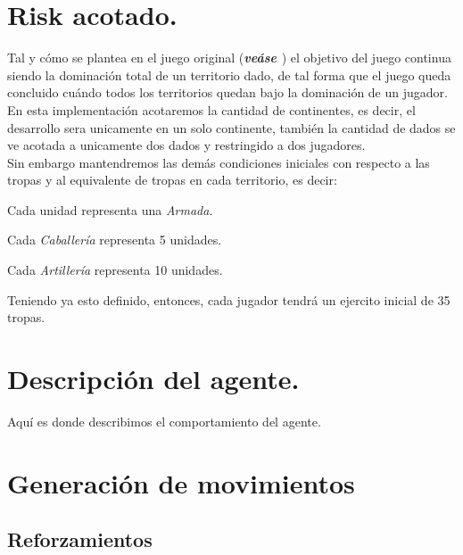 \documentclass[12pt,twocolumn,draft]{article}
\begin{document}
\section{Risk acotado.}

Tal y c\'omo se plantea en el juego original (\textbf{\textit{ve\'ase \cite{RISK}}}) el objetivo del juego continua siendo la dominaci\'on total de un territorio dado, de tal forma
que el juego queda concluido cu\'ando todos los territorios quedan bajo la dominaci\'on de 
un jugador.\\
En esta implementaci\'on acotaremos la cantidad de continentes, es decir, el desarrollo sera unicamente en un solo continente, tambi\'en la cantidad de dados se ve acotada a unicamente dos dados y restringido a dos jugadores.\\

Sin embargo mantendremos las dem\'as condiciones iniciales con respecto a las tropas y al equivalente de tropas en cada territorio, es decir:
\begin{list}{*}{}
\item Cada unidad representa una \textit{Armada}.
\item Cada \textit{Caballer\'ia} representa 5 unidades.
\item Cada \textit{Artiller\'ia} representa 10 unidades.
\end{list}

Teniendo ya esto definido, entonces, cada jugador tendr\'a un ejercito inicial de 35 tropas.

\section{Descripci\'on del agente.}
Aqu\'i es donde describimos el comportamiento del agente.

\section{Generaci\'on de movimientos}

\subsection{Reforzamientos}
\end{document}

